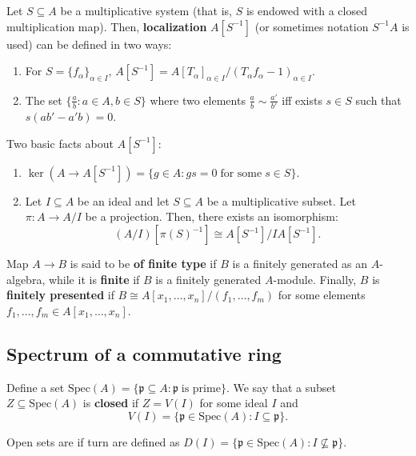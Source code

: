 \documentclass{template}
\begin{document}
\begin{definition}
    Let $S \subseteq A$ be a multiplicative system (that is, $S$ is endowed with
    a closed multiplication map). Then, \textbf{localization} $A[S^{-1}]$ (or 
    sometimes notation $S^{-1}A$ is used) can be defined in two ways:
    \begin{enumerate}
        \item[(i)] For $S=\{f_{\alpha}\}_{\alpha \in I}$, $A[S^{-1}] =
        A[T_{\alpha}]_{\alpha \in I}/(T_{\alpha}f_{\alpha}-1)_{\alpha \in I}$.
        \item[(ii)] The set $\{\frac{a}{b}: a \in A, b \in S\}$ where two
        elements $\frac{a}{b} \sim \frac{a'}{b'}$ iff exists $s \in S$ such that
        $s(ab'-a'b) = 0$.
    \end{enumerate}
\end{definition}

\begin{lemma}
    Two basic facts about $A[S^{-1}]$:
    \begin{enumerate}
        \item[(i)] $\ker(A \to A[S^{-1}]) = \{g \in A: gs = 0 \; \text{for some}
        \; s \in S\}$.
        \item[(ii)] Let $I \subseteq A$ be an ideal and let $S \subseteq A$ be a
        multiplicative subset. Let $\pi: A \to A/I$ be a projection. Then, there
        exists an isomorphism:
        \begin{equation*}
            (A/I)[\pi(S)^{-1}] \cong A[S^{-1}]/IA[S^{-1}].
        \end{equation*}
    \end{enumerate}
\end{lemma}

\begin{definition}
    Map $A \to B$ is said to be \textbf{of finite type} if $B$ is a finitely
    generated as an $A$-algebra, while it is \textbf{finite} if $B$ is a
    finitely generated $A$-module. Finally, $B$ is \textbf{finitely presented}
    if $B \cong A[x_1,\dots,x_n]/(f_1,\dots,f_m)$ for some elements
    $f_1,\dots,f_m \in A[x_1,\dots,x_n]$.
\end{definition}

\subsection{Spectrum of a commutative ring}

\begin{definition}
    Define a set $\text{Spec}(A) = \{\mathfrak{p} \subseteq A: \mathfrak{p} \;
    \text{is prime}\}$. We say that a subset $Z \subseteq \text{Spec}(A)$
    is \textbf{closed} if $Z=V(I)$ for some ideal $I$ and
    \begin{equation*}
        V(I) = \{\mathfrak{p} \in \text{Spec}(A): I \subseteq \mathfrak{p}\}.
    \end{equation*}

    Open sets are if turn are defined as $D(I) = \{\mathfrak{p} \in
    \text{Spec}(A): I \not\subseteq \mathfrak{p}\}$.
\end{definition}
\end{document}
